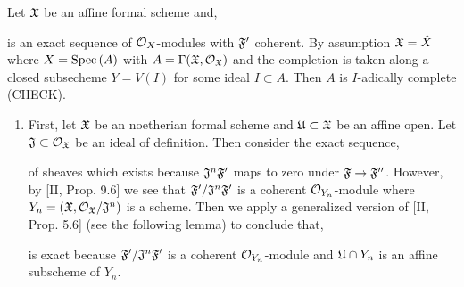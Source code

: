 \documentclass[12pt]{article}
\begin{document}
Let $\mathfrak{X}$ be an affine formal scheme and,
\begin{center}
\end{center}
is an exact sequence of $\mathcal{O}_{X}$-modules with $\mathfrak{F}'$ coherent. By assumption $\mathfrak{X} = \hat{X}$ where $X = \mathrm{Spec}\left( A \right)$ with $A = \Gamma(\mathfrak{X}, \mathcal{O}_{\mathfrak{X}})$ and the completion is taken along a closed subsecheme $Y = V(I)$ for some ideal $I \subset A$. Then $A$ is $I$-adically complete (CHECK).

\begin{enumerate}
\item First, let $\mathfrak{X}$ be an noetherian formal scheme and $\mathfrak{U} \subset \mathfrak{X}$ be an affine open. Let $\mathfrak{J} \subset \mathcal{O}_{\mathfrak{X}}$ be an ideal of definition. Then consider the exact sequence,
\begin{center}
\end{center}
of sheaves which exists because $\mathfrak{J}^n \mathfrak{F}'$ maps to zero under $\mathfrak{F} \to \mathfrak{F}''$. However, by [II, Prop. 9.6] we see that $\mathfrak{F}'/\mathfrak{J}^n \mathfrak{F}'$ is a coherent $\mathcal{O}_{Y_n}$-module where $Y_n = (\mathfrak{X}, \mathcal{O}_{\mathfrak{X}} / \mathfrak{J}^n)$ is a scheme. Then we apply a generalized version of [II, Prop. 5.6] (see the following lemma) to conclude that,
\begin{center}
\end{center}
is exact because $\mathfrak{F}'/\mathfrak{J}^n \mathfrak{F}'$ is a coherent $\mathcal{O}_{Y_n}$-module and $\mathfrak{U} \cap Y_n$ is an affine subscheme of $Y_n$.


\end{enumerate}
\end{document}
